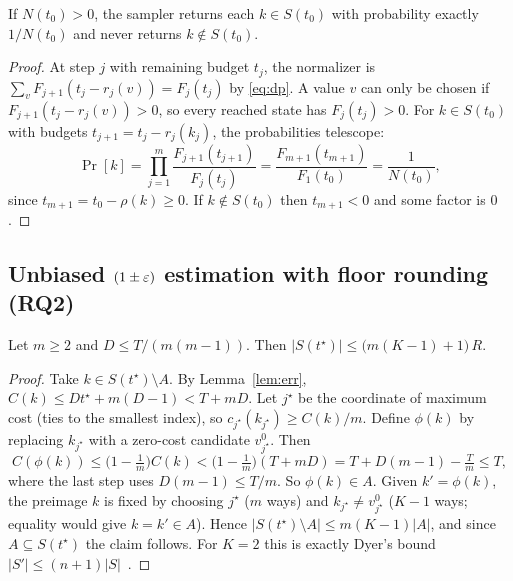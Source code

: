 \begin{lemma}\label{lem:sampler}
If $N(t_0)>0$, the sampler returns each $k\in S(t_0)$ with probability exactly $1/N(t_0)$ and never returns $k\notin S(t_0)$.
\end{lemma}
\begin{proof}
At step $j$ with remaining budget $t_j$, the normalizer is $\sum_vF_{j+1}(t_j-r_j(v))=F_j(t_j)$ by
\eqref{eq:dp}. A value $v$ can only be chosen if $F_{j+1}(t_j-r_j(v))>0$, so every reached state has $F_j(t_j)>0$.
For $k\in S(t_0)$ with budgets $t_{j+1}=t_j-r_j(k_j)$, the probabilities telescope:
\[\Pr[k]=\prod_{j=1}^m\frac{F_{j+1}(t_{j+1})}{F_j(t_j)}=\frac{F_{m+1}(t_{m+1})}{F_1(t_0)}=\frac{1}{N(t_0)},\]
since $t_{m+1}=t_0-\rho(k)\ge0$. If $k\notin S(t_0)$ then $t_{m+1}<0$ and some factor is $0$.
\end{proof}

\subsection{Unbiased $(1\pm\varepsilon)$ estimation with floor rounding (RQ2)}
\begin{lemma}\label{lem:dyer}
Let $m\ge2$ and $D\le T/(m(m-1))$. Then $|S(t^\star)|\le\big(m(K-1)+1\big)\,R$.
\end{lemma}
\begin{proof}
Take $k\in S(t^\star)\setminus A$. By Lemma~\ref{lem:err}, $C(k)\le Dt^\star+m(D-1)<T+mD$.
Let $j^\star$ be the coordinate of maximum cost (ties to the smallest index), so $c_{j^\star}(k_{j^\star})\ge C(k)/m$.
Define $\phi(k)$ by replacing $k_{j^\star}$ with a zero-cost candidate $v^0_{j^\star}$. Then
\[ C(\phi(k))\le\Big(1-\tfrac1m\Big)C(k)<\Big(1-\tfrac1m\Big)(T+mD)=T+D(m-1)-\tfrac Tm\le T, \]
where the last step uses $D(m-1)\le T/m$. So $\phi(k)\in A$. Given $k'=\phi(k)$, the preimage $k$ is fixed by
choosing $j^\star$ ($m$ ways) and $k_{j^\star}\neq v^0_{j^\star}$ ($K-1$ ways; equality would give
$k=k'\in A$). Hence $|S(t^\star)\setminus A|\le m(K-1)|A|$, and since $A\subseteq S(t^\star)$ the claim follows.
For $K=2$ this is exactly Dyer's bound $|S'|\le(n+1)|S|$~\cite{dyer2003}.
\end{proof}

